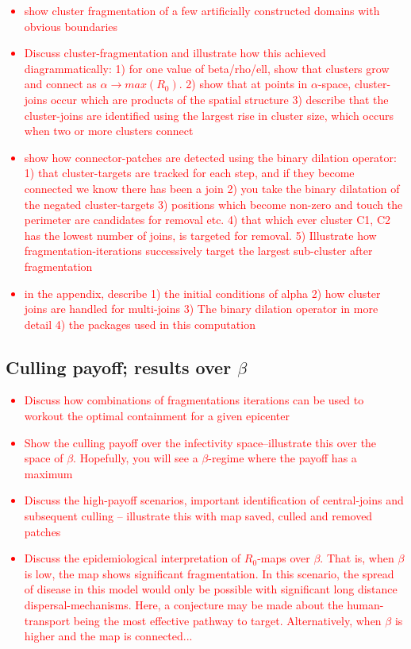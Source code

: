\textcolor{red}{
\begin{itemize}
    \item show cluster fragmentation of a few artificially constructed domains with obvious boundaries
    \item Discuss cluster-fragmentation and illustrate how this achieved diagrammatically: 1) for one value of beta/rho/ell, show that clusters grow and connect as $\alpha \rightarrow max(R_0)$. 2) show that at points in $\alpha$-space, cluster-joins occur which are products of the spatial structure 3) describe that the cluster-joins are identified using the largest rise in cluster size, which occurs when two or more clusters connect
    \item show how connector-patches are detected using the binary dilation operator: 1) that cluster-targets are tracked for each step, and if they become connected we know there has been a join 2) you take the binary dilatation of the negated cluster-targets 3) positions which become non-zero and touch the perimeter are candidates for removal etc. 4) that which ever cluster C1, C2 has the lowest number of joins, is targeted for removal. 5) Illustrate how fragmentation-iterations successively target the largest sub-cluster after fragmentation
    \item in the appendix, describe 1) the initial conditions of alpha 2) how cluster joins are handled for multi-joins 3) The binary dilation operator in more detail 4) the packages used in this computation 
\end{itemize}
}

\subsection{Culling payoff; results over $\beta$ }

\textcolor{red}{
\begin{itemize}
    \item Discuss how combinations of fragmentations iterations can be used to workout the optimal containment for a given epicenter
    \item Show the culling payoff over the infectivity space--illustrate this over the space of $\beta$. Hopefully, you will see a $\beta$-regime where the payoff has a maximum
    \item Discuss the high-payoff scenarios, important identification of central-joins and subsequent culling -- illustrate this with map saved, culled and removed patches
    \item Discuss the epidemiological interpretation of $R_0$-maps over $\beta$. That is, when $\beta$ is low, the map shows significant fragmentation. In this scenario, the spread of disease in this model would only be possible with significant long distance dispersal-mechanisms. Here, a conjecture may be made about the human-transport being the most effective pathway to target. Alternatively, when $\beta$ is higher and the map is connected...
\end{itemize}}
